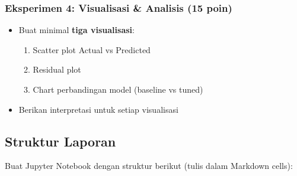 \documentclass[12pt,a4paper]{article}
\begin{document}
\subsubsection{Eksperimen 4: Visualisasi \& Analisis (15 poin)}
\begin{itemize}
    \item Buat minimal \textbf{tiga visualisasi}:
    \begin{enumerate}
        \item Scatter plot Actual vs Predicted
        \item Residual plot
        \item Chart perbandingan model (baseline vs tuned)
    \end{enumerate}
    \item Berikan interpretasi untuk setiap visualisasi
\end{itemize}

\subsection{Struktur Laporan}

Buat Jupyter Notebook dengan struktur berikut (tulis dalam Markdown cells):
\end{document}
